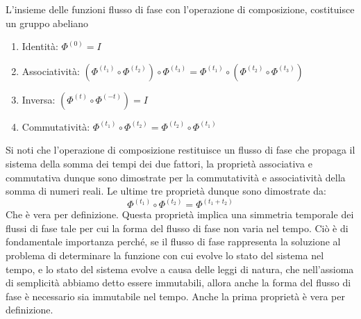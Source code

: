 \documentclass[
10pt, %
a4paper, %
oneside, %
headinclude,footinclude, %
BCOR5mm, %
]{scrartcl}
\begin{document}
\begin{teorema}
	L'insieme delle funzioni flusso di fase con l'operazione di composizione, costituisce un gruppo abeliano
	\begin{enumerate}
		\item Identità: \(\Phi^{(0)} = I\)
		\item Associatività: \((\Phi^{(t_1)}\circ\Phi^{(t_2)})\circ\Phi^{(t_3)} = \Phi^{(t_1)}\circ(\Phi^{(t_2)}\circ\Phi^{(t_3)})\)
		\item Inversa: \((\Phi^{(t)}\circ\Phi^{(-t)}) = I\)
		\item Commutatività: \(\Phi^{(t_1)}\circ\Phi^{(t_2)} = \Phi^{(t_2)}\circ\Phi^{(t_1)}\)
	\end{enumerate}
Si noti che l'operazione di composizione restituisce un flusso di fase che propaga il sistema della somma dei tempi dei due fattori, la proprietà associativa e commutativa dunque sono dimostrate per la commutatività e associatività della somma di numeri reali. Le ultime tre proprietà dunque sono dimostrate da:
\[\Phi^{(t_1)}\circ\Phi^{(t_2)} = \Phi^{(t_1 + t_2)}\]
Che è vera per definizione. Questa proprietà implica una simmetria temporale dei flussi di fase tale per cui la forma del flusso di fase non varia nel tempo. Ciò è di fondamentale importanza perché, se il flusso di fase rappresenta la soluzione al problema di determinare la funzione con cui evolve lo stato del sistema nel tempo, e lo stato del sistema evolve a causa delle leggi di natura, che nell'assioma di semplicità abbiamo detto essere immutabili, allora anche la forma del flusso di fase è necessario sia immutabile nel tempo. Anche la prima proprietà è vera per definizione.
\end{teorema}
\end{document}
